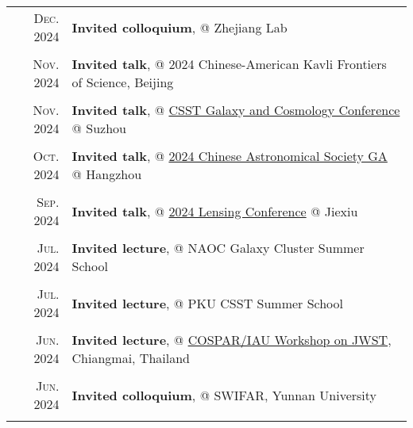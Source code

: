 \documentclass[letterpaper,10pt]{article}
\newcommand{\textwrap}{5.8in}       %
\begin{document}
\begingroup
\renewcommand\arraystretch{0.3}
\vspace*{-.5em}
\begin{longtable}{r|p{\textwrap}}

    \textsc{Dec. 2024}   &   \textbf{Invited colloquium}, @ Zhejiang Lab \\
    \multicolumn{2}{c}{} \\

    \textsc{Nov. 2024}   &   \textbf{Invited talk}, @ 2024 Chinese-American Kavli Frontiers of Science, Beijing \\
    \multicolumn{2}{c}{} \\

    \textsc{Nov. 2024}   &   \textbf{Invited talk}, @ \href{https://csstgc2024.casconf.cn/}{CSST Galaxy and Cosmology Conference} @ Suzhou \\
    \multicolumn{2}{c}{} \\

    \textsc{Oct. 2024}   &   \textbf{Invited talk}, @ \href{https://2024casmeeting.casconf.cn/}{2024 Chinese Astronomical Society GA} @ Hangzhou \\
    \multicolumn{2}{c}{} \\

    \textsc{Sep. 2024}   &   \textbf{Invited talk}, @ \href{https://cglensing2024.casconf.cn/}{2024 Lensing Conference} @ Jiexiu \\
    \multicolumn{2}{c}{} \\

    \textsc{Jul. 2024}   &   \textbf{Invited lecture}, @ NAOC Galaxy Cluster Summer School \\
    \multicolumn{2}{c}{} \\

    \textsc{Jul. 2024}   &   \textbf{Invited lecture}, @ PKU CSST Summer School \\
    \multicolumn{2}{c}{} \\

    \textsc{Jun. 2024}   &   \textbf{Invited lecture}, @ \href{https://cosparhq.cnes.fr/events/cospar-capacity-building-workshops/}{COSPAR/IAU Workshop on JWST}, Chiangmai, Thailand \\
    \multicolumn{2}{c}{} \\

    \textsc{Jun. 2024}   &   \textbf{Invited colloquium}, @ SWIFAR, Yunnan University \\
    \multicolumn{2}{c}{} \\


\end{longtable}
\end{document}
